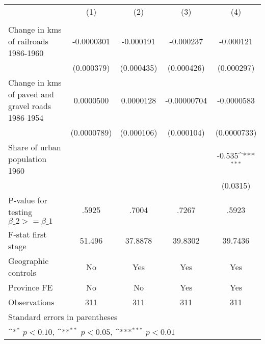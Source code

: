 {
\def\sym#1{\ifmmode^{#1}\else\(^{#1}\)\fi}
\begin{tabular}{l*{4}{c}}
\hline\hline
                &\multicolumn{1}{c}{(1)}&\multicolumn{1}{c}{(2)}&\multicolumn{1}{c}{(3)}&\multicolumn{1}{c}{(4)}\\
                &\multicolumn{1}{c}{}&\multicolumn{1}{c}{}&\multicolumn{1}{c}{}&\multicolumn{1}{c}{}\\
\hline
Change in kms of railroads 1986-1960&-0.0000301         &-0.000191         &-0.000237         &-0.000121         \\
                &(0.000379)         &(0.000435)         &(0.000426)         &(0.000297)         \\
[1em]
Change in kms of paved and gravel roads 1986-1954&0.0000500         &0.0000128         &-0.00000704         &-0.0000583         \\
                &(0.0000789)         &(0.000106)         &(0.000104)         &(0.0000733)         \\
[1em]
Share of urban population 1960&                  &                  &                  &   -0.535\sym{***}\\
                &                  &                  &                  & (0.0315)         \\
\hline
P-value for testing $\beta\_{2} >= \beta\_{1}$&    .5925         &    .7004         &    .7267         &    .5923         \\
F-stat first stage&   51.496         &  37.8878         &  39.8302         &  39.7436         \\
Geographic controls&       No         &      Yes         &      Yes         &      Yes         \\
Province FE     &       No         &       No         &      Yes         &      Yes         \\
Observations    &      311         &      311         &      311         &      311         \\
\hline\hline
\multicolumn{5}{l}{\footnotesize Standard errors in parentheses}\\
\multicolumn{5}{l}{\footnotesize \sym{*} \(p<0.10\), \sym{**} \(p<0.05\), \sym{***} \(p<0.01\)}\\
\end{tabular}
}
